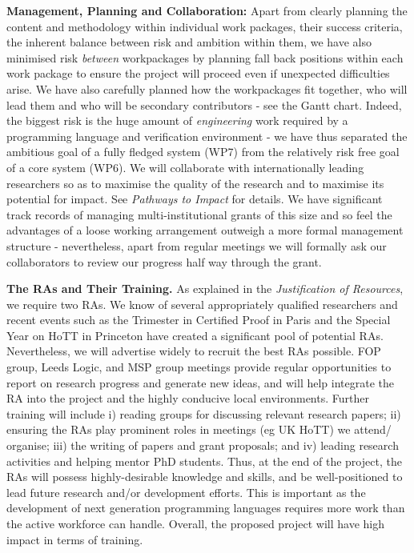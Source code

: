 \documentclass[a4paper,11pt]{article}
\begin{document}

{\bf Management, Planning and Collaboration:} Apart from clearly
planning the content and methodology within individual work packages,
their success criteria, the inherent balance between risk and ambition
within them, we have also minimised risk {\em between} workpackages by
planning fall back positions within each work package to ensure the
project will proceed even if unexpected difficulties arise. We have
also carefully planned how the workpackages fit together, who will
lead them and who will be secondary contributors - see the 
Gantt chart. Indeed, the biggest risk is the huge amount of
 {\em engineering} work required by a programming language and
verification environment - we have thus separated the
ambitious goal of a fully fledged system (WP7) from the relatively
risk free goal of a core system (WP6). We will collaborate with internationally leading researchers
so as to maximise the quality of the research and to maximise its
potential for impact. See {\em Pathways to Impact} for
details. We have significant track records of managing
multi-institutional grants of this size and so feel the advantages of
a loose working arrangement outweigh a more formal management
structure - nevertheless, apart from regular meetings we will formally
ask our collaborators to review our progress half way through the grant.


{\bf The RAs and Their Training.} As explained in the {\em Justification of
Resources}, we require two RAs. We know
of several appropriately qualified researchers and recent
events such as the Trimester in Certified Proof in Paris and the
Special Year on HoTT in Princeton have created a significant pool of
potential RAs. Nevertheless, we will advertise widely to recruit the
best RAs possible. %
FOP group, Leeds Logic, and MSP group meetings
provide regular opportunities to report on research progress and
generate new ideas, and will help integrate the RA into the project
and the highly conducive local environments. Further training will
include i) reading groups for discussing relevant research papers; ii)
ensuring the RAs play prominent roles in meetings (eg UK HoTT) we
attend/
organise; iii) the writing of papers and
grant proposals; and iv) leading research activities and helping
mentor PhD students.  Thus, at the end of the project, the RAs will
possess highly-desirable knowledge and skills, and be well-positioned
to lead future research and/or development efforts. This is important as
the development of next generation programming languages requires more
work than the active workforce can handle. Overall, the proposed
project will have high impact in terms of training.
\end{document}
